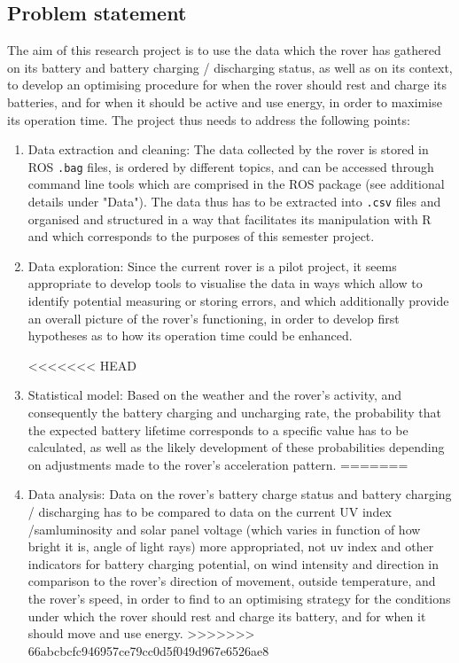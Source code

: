 \documentclass[11pt, UKenglish]{report}
\begin{document}
{\subsection*{Problem statement}

The aim of this research project is to use the data which the rover has gathered on its battery and battery charging / discharging status, as well as on its context, to develop an optimising procedure for when the rover should rest and charge its batteries, and for when it should be active and use energy, in order to maximise its operation time. The project thus needs to address the following points:

\begin{enumerate}

	\item{\large{Data extraction and cleaning:} \normalsize The data collected by the rover is stored in ROS \texttt{.bag} files, is ordered by different topics, and can be accessed through command line tools which are comprised in the ROS package (see additional details under "Data"). The data thus has to be extracted into \texttt{.csv} files and organised and structured in a way that facilitates its manipulation with R and which corresponds to the purposes of this semester project.}

	\item{\large{Data exploration:} \normalsize Since the current rover is a pilot project, it seems appropriate to develop tools to visualise the data in ways which allow to identify potential measuring or storing errors, and which additionally provide an overall picture of the rover's functioning, in order to develop first hypotheses as to how its operation time could be enhanced.}

<<<<<<< HEAD
	\item{\large{Statistical model:} \normalsize Based on the weather and the rover's activity, and consequently the battery charging and uncharging rate, the probability that the expected battery lifetime corresponds to a specific value has to be calculated, as well as the likely development of these probabilities depending on adjustments made to the rover's acceleration pattern. }
=======
	\item{\large{Data analysis:} \normalsize Data on the rover's battery charge status and battery charging / discharging has to be compared to data on the current UV index /sam{luminosity and solar panel voltage (which varies in function of how bright it is, angle of light rays) more appropriated, not uv index}  and other indicators for battery charging potential, on wind intensity and direction in comparison to the rover's direction of movement, outside temperature, and the rover's speed, in order to find to an optimising strategy for the conditions under which the rover should rest and charge its battery, and for when it should move and use energy.}
>>>>>>> 66abcbcfc946957ce79cc0d5f049d967e6526ae8


\end{enumerate}}
\end{document}
